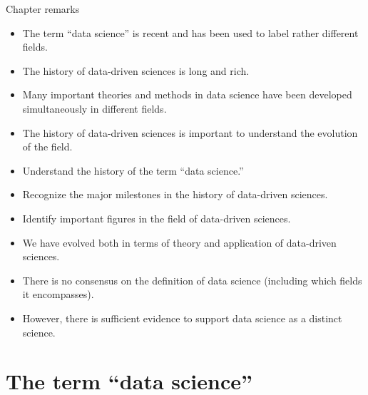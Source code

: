 \begin{mainbox}{Chapter remarks}


  \startcontents[chapters]
  \vspace{1em}


  \begin{itemize}
    \itemsep0em
    \item The term ``data science'' is recent and has been used to label rather different
      fields.
    \item The history of data-driven sciences is long and rich.
    \item Many important theories and methods in data science have been developed
      simultaneously in different fields.
    \item The history of data-driven sciences is important to understand the evolution of
      the field.
  \end{itemize}


  \begin{itemize}
    \itemsep0em
    \item Understand the history of the term ``data science.''
    \item Recognize the major milestones in the history of data-driven sciences.
    \item Identify important figures in the field of data-driven sciences.
  \end{itemize}


  \begin{itemize}
    \itemsep0em
    \item We have evolved both in terms of theory and application of data-driven sciences.
    \item There is no consensus on the definition of data science (including which fields
      it encompasses).
    \item However, there is sufficient evidence to support data science as a distinct science.
  \end{itemize}
\end{mainbox}

{}
\clearpage

\section{The term ``data science''}

